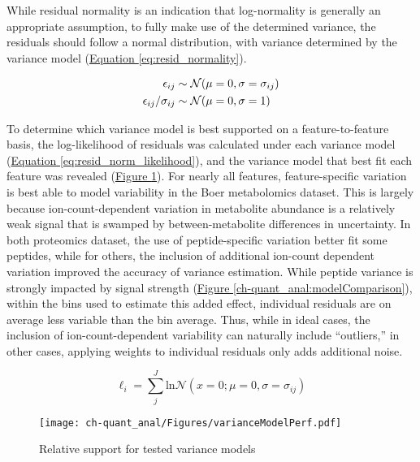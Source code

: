 While residual normality is an indication that log-normality is generally an appropriate assumption, to fully make use of the determined variance, the residuals should follow a normal distribution, with variance determined by the variance model (\hyperref[eq:resid_normality]{Equation \ref{eq:resid_normality}}).

\begin{align}
\epsilon_{ij} &\sim \mathcal{N}(\mu = 0, \sigma = \sigma_{ij})\notag\\
\epsilon_{ij} / \sigma_{ij} &\sim \mathcal{N}(\mu = 0, \sigma = 1)\label{eq:resid_normality}
\end{align}

To determine which variance model is best supported on a feature-to-feature basis, the log-likelihood of residuals was calculated under each variance model (\hyperref[eq:resid_norm_likelihood]{Equation \ref{eq:resid_norm_likelihood}}), and the variance model that best fit each feature was revealed (\hyperref[ch-quant_anal:modelFits]{Figure \ref{ch-quant_anal:modelFits}}). For nearly all features, feature-specific variation is best able to model variability in the Boer metabolomics dataset. This is largely because ion-count-dependent variation in metabolite abundance is a relatively weak signal that is swamped by between-metabolite differences in uncertainty.  In both proteomics dataset, the use of peptide-specific variation better fit some peptides, while for others, the inclusion of additional ion-count dependent variation improved the accuracy of variance estimation. While peptide variance is strongly impacted by signal strength (\hyperref[ch-quant_anal:modelComparison]{Figure \ref{ch-quant_anal:modelComparison}}), within the bins used to estimate this added effect, individual residuals are on average less variable than the bin average. Thus, while in ideal cases, the inclusion of ion-count-dependent variability can naturally include ``outliers,'' in other cases, applying weights to individual residuals only adds additional noise. 

\begin{equation}
\ell_{i} = \sum_{j}^{J}\text{ln}\mathcal{N}(x = 0; \mu = 0, \sigma = \sigma_{ij})\label{eq:resid_norm_likelihood}
\end{equation}

\begin{figure}[h!]
\begin{center}
\texttt{[image: ch-quant\_anal/Figures/varianceModelPerf.pdf]}
\caption[Relative support for tested variance models]{Relative support for tested variance models}
\label{ch-quant_anal:modelFits}
\end{center}
\end{figure}

